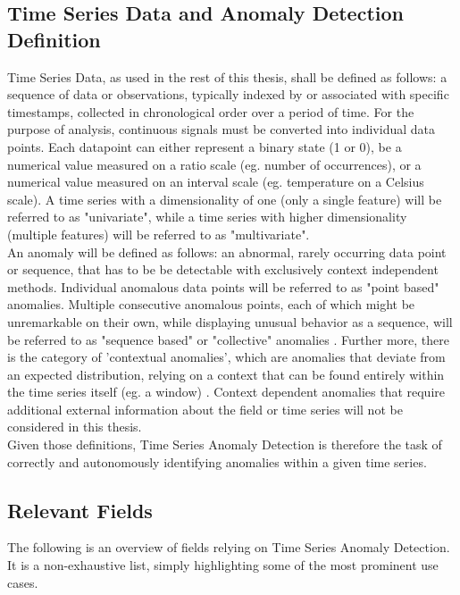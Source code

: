 \documentclass[12pt,oneside]{article}
\begin{document}
\subsection{Time Series Data and Anomaly Detection Definition}
Time Series Data, as used in the rest of this thesis, shall be defined as follows: a sequence of data or observations, typically indexed by or associated with specific timestamps, collected in chronological order over a period of time.
For the purpose of analysis, continuous signals must be converted into individual data points. Each datapoint can either represent a binary state (1 or 0), be a numerical value measured on a ratio scale (eg. number of occurrences), or a numerical value measured on an interval scale (eg. temperature on a Celsius scale).
A time series with a dimensionality of one (only a single feature) will be referred to as "univariate", while a time series with higher dimensionality (multiple features) will be referred to as "multivariate". \\
An anomaly will be defined as follows: an abnormal, rarely occurring data point or sequence, that has to be be detectable with exclusively context independent methods. Individual anomalous data points will be referred to as "point based" anomalies. Multiple consecutive anomalous points, each of which might be unremarkable on their own, while displaying unusual behavior as a sequence,  will be referred to as "sequence based" or "collective" anomalies \parencites[p.~3]{liu2024elephant}[p.~8]{chalapathy2019deeplearninganomalydetection}. Further more, there is the category of 'contextual anomalies', which are anomalies that deviate from an expected distribution, relying on a context that can be found entirely within the time series itself (eg. a window) \parencite[p.1699]{paparrizos2022tsb}. Context dependent anomalies that require additional external information about the field or time series will not be considered in this thesis. \\
Given those definitions, Time Series Anomaly Detection is therefore the task of correctly and autonomously identifying anomalies within a given time series.


\subsection{Relevant Fields}

The following is an overview of fields relying on Time Series Anomaly Detection. It is a non-exhaustive list, simply highlighting some of the most prominent use cases. \
\end{document}
